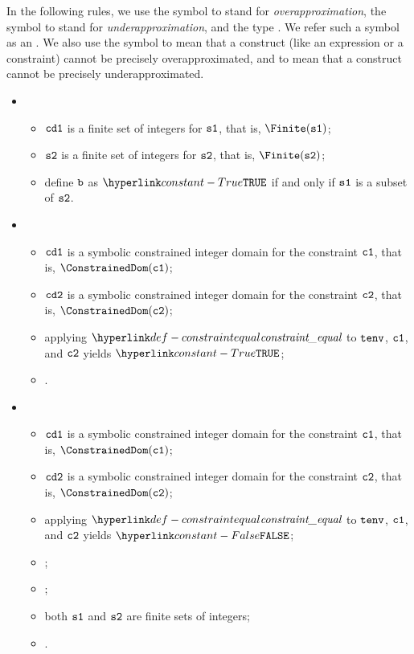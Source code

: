 \hypertarget{def-approximationdirectionterm}{}
In the following rules, we use the symbol  to stand for \emph{overapproximation},
the symbol  to stand for \emph{underapproximation},
and the type .
We refer such a symbol as an \approximationdirectionterm.
We also use the symbol  to mean that a construct
(like an expression or a constraint) cannot be precisely overapproximated,
and  to mean that a construct cannot be precisely
underapproximated.

\ProseParagraph
\OneApplies
\begin{itemize}
  \item {}
  \begin{itemize}
    \item $\texttt{cd1}$ is a finite set of integers for $\vsone$, that is, $\Finite(\vsone)$;
    \item $\vstwo$ is a finite set of integers for $\vstwo$, that is, $\Finite(\vstwo)$;
    \item define $\vb$ as $\True$ if and only if $\vsone$ is a subset of $\vstwo$.
  \end{itemize}

  \item {}
  \begin{itemize}
    \item $\texttt{cd1}$ is a symbolic constrained integer domain for the constraint $\vcone$, that is, $\ConstrainedDom(\vcone)$;
    \item $\texttt{cd2}$ is a symbolic constrained integer domain for the constraint $\vctwo$, that is, $\ConstrainedDom(\vctwo)$;
    \item applying $\constraintequal$ to $\tenv$, $\vcone$, and $\vctwo$ yields $\True$;
    \item \Proseeqdef{$\vb$}{$\True$}.
  \end{itemize}

  \item {}
  \begin{itemize}
    \item $\texttt{cd1}$ is a symbolic constrained integer domain for the constraint $\vcone$, that is, $\ConstrainedDom(\vcone)$;
    \item $\texttt{cd2}$ is a symbolic constrained integer domain for the constraint $\vctwo$, that is, $\ConstrainedDom(\vctwo)$;
    \item applying $\constraintequal$ to $\tenv$, $\vcone$, and $\vctwo$ yields $\False$;
    \item \Proseapproxconstraint{$\tenv$}{$\vcone$}{$\Over$}{$\vsone$};
    \item \Proseapproxconstraint{$\tenv$}{$\vctwo$}{$\Under$}{$\vstwo$};
    \item both $\vsone$ and $\vstwo$ are finite sets of integers;
    \item {}.
  \end{itemize}


\end{itemize}

